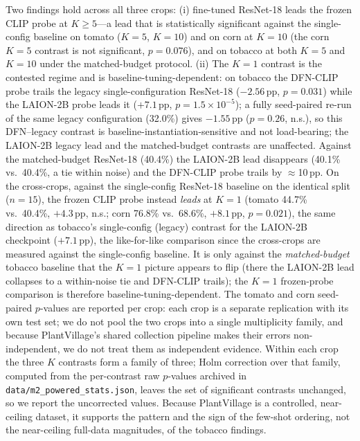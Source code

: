 \documentclass[10pt,a4paper]{article}
\begin{document}
Two findings hold across all three crops: (i) fine-tuned ResNet-18 leads the frozen CLIP probe at $K{\geq}5$---a lead that is statistically significant against the single-config baseline on tomato ($K{=}5$, $K{=}10$) and on corn at $K{=}10$ (the corn $K{=}5$ contrast is not significant, $p{=}0.076$), and on tobacco at both $K{=}5$ and $K{=}10$ under the matched-budget protocol. (ii) The $K{=}1$ contrast is the contested regime and is baseline-tuning-dependent: on tobacco the DFN-CLIP probe trails the legacy single-configuration ResNet-18 ($-2.56$\,pp, $p{=}0.031$) while the LAION-2B probe leads it ($+7.1$\,pp, $p{=}1.5\times10^{-5}$); a fully seed-paired re-run of the same legacy configuration (32.0\%) gives $-1.55$\,pp ($p{=}0.26$, n.s.), so this DFN--legacy contrast is baseline-instantiation-sensitive and not load-bearing; the LAION-2B legacy lead and the matched-budget contrasts are unaffected. Against the matched-budget ResNet-18 (40.4\%) the LAION-2B lead disappears (40.1\% vs.\ 40.4\%, a tie within noise) and the DFN-CLIP probe trails by $\approx$10\,pp. On the cross-crops, against the single-config ResNet-18 baseline on the identical split ($n{=}15$), the frozen CLIP probe instead \emph{leads} at $K{=}1$ (tomato 44.7\% vs.\ 40.4\%, $+4.3$\,pp, n.s.; corn 76.8\% vs.\ 68.6\%, $+8.1$\,pp, $p{=}0.021$), the same direction as tobacco's single-config (legacy) contrast for the LAION-2B checkpoint ($+7.1$\,pp), the like-for-like comparison since the cross-crops are measured against the single-config baseline. It is only against the \emph{matched-budget} tobacco baseline that the $K{=}1$ picture appears to flip (there the LAION-2B lead collapses to a within-noise tie and DFN-CLIP trails); the $K{=}1$ frozen-probe comparison is therefore baseline-tuning-dependent. The tomato and corn seed-paired $p$-values are reported per crop: each crop is a separate replication with its own test set; we do not pool the two crops into a single multiplicity family, and because PlantVillage's shared collection pipeline makes their errors non-independent, we do not treat them as independent evidence. Within each crop the three $K$ contrasts form a family of three; Holm correction over that family, computed from the per-contrast raw $p$-values archived in \texttt{data/m2\_powered\_stats.json}, leaves the set of significant contrasts unchanged, so we report the uncorrected values. Because PlantVillage is a controlled, near-ceiling dataset, it supports the pattern and the sign of the few-shot ordering, not the near-ceiling full-data magnitudes, of the tobacco findings.
\end{document}
